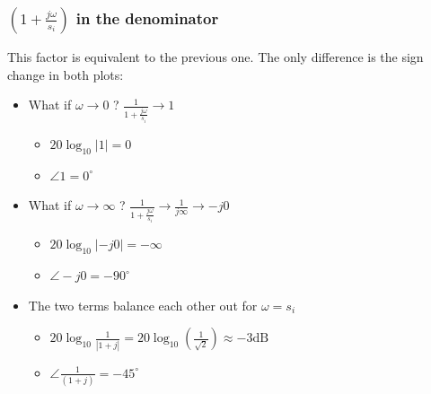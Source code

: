 \begin{frame}
\frametitle{$(1+\frac{j\omega}{s_i})$ in the denominator}
This factor is equivalent to the previous one. The only difference is the sign change in both plots:

\begin{itemize}
\item What if $\omega \rightarrow 0$ ? \quad $\frac{1}{1+\frac{j\omega}{s_i}} \rightarrow 1$
\begin{itemize}
\item $20\log_{10}|1| = 0$
\item $\angle 1 = 0^{\circ}$
\end{itemize}

\item What if $\omega \rightarrow \infty$ ?  \quad  $\frac{1}{1+\frac{j\omega}{s_i}} \rightarrow \frac{1}{j\infty} \rightarrow -j0$
\begin{itemize}
\item $20\log_{10}|-j0| = -\infty$
\item $\angle -j0 = -90^{\circ}$
\end{itemize}

\item The two terms balance each other out for $\omega = s_i$
\begin{itemize}
\item $20\log_{10}\frac{1}{|1+j|} = 20\log_{10}(\frac{1}{\sqrt 2}) \approx -3 \text{dB}$
\item $\angle\frac{1}{(1+j)} = -45^{\circ}$
\end{itemize}
\end{itemize}


\end{frame}


